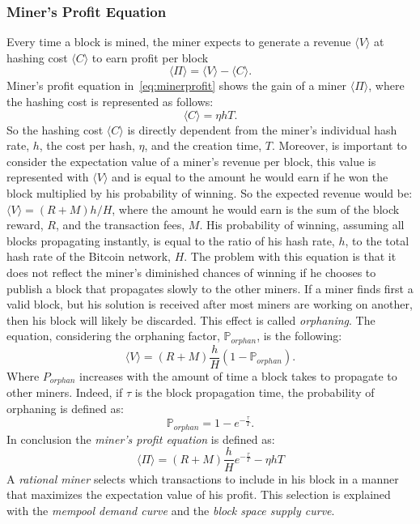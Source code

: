 \documentclass[USenglish]{uit-thesis}
\begin{document}
\subsubsection{Miner's Profit Equation}
Every time a block is mined, the miner expects to generate a revenue $\langle V \rangle$
at hashing cost $\langle C \rangle$ to earn profit per block
\begin{equation}
\label{eq:minerprofit}
\langle \Pi \rangle = \langle V\rangle - \langle C\rangle.
\end{equation}
Miner's profit equation in~\ref{eq:minerprofit} shows the gain of a miner $\langle \Pi \rangle$,
where the hashing cost is represented as follows:
\begin{equation}
\label{eq:hashingcost}
\langle C\rangle = \eta hT.
\end{equation}
So the hashing cost $\langle C\rangle$ is directly dependent from the miner's individual hash rate, $h$,
the cost per hash, $\eta$, and the creation time, $T$. Moreover, is important to consider the
expectation value of a miner's revenue per block, this value is represented with $\langle V\rangle$
and is equal to the amount he would earn if he won the block multiplied by his probability of
winning. So the expected revenue would be:
$\langle V\rangle = (R + M) h/H$,
where the amount he would earn is the sum of the block reward, $R$, and the transaction fees, $M$.
His probability of winning, assuming all blocks propagating instantly, is equal to the ratio of his hash
rate, $h$, to the total hash rate of the Bitcoin network, $H$. The problem with this equation is that it
does not reflect the miner's diminished chances of winning if he chooses to publish a block that propagates
slowly to the other miners. If a miner finds first a valid block, but his solution is received after most miners
are working on another, then his block will likely be discarded. This effect is called \emph{orphaning}. The
equation, considering the orphaning factor, $\mathbb{P}_{orphan}$, is the following:
\begin{equation}
\label{eq:expectedrevenue}
\langle V\rangle = \left(R + M\right)\frac{h}{H}\left(1 - \mathbb{P}_{orphan}\right).
\end{equation}
Where $P_{orphan}$ increases with the amount of time a block takes
to propagate to other miners. Indeed, if $\tau$ is
the block propagation time, the
probability of orphaning is defined as:
\begin{equation}
\label{eq:orphaning}
\mathbb{P}_{orphan} = 1 - e^{-\frac{\tau}{T}}.
\end{equation}
In conclusion the \emph{miner's profit equation} is defined as:
\begin{equation}
\label{eq:minerprofiteq}
\langle \Pi \rangle = (R + M)\frac{h}{H} e^{-\frac{\tau}{T}} -\eta hT
\end{equation}
A \emph{rational miner} selects which transactions to include in his block in a manner that maximizes
the expectation value of his profit. This selection is explained with the \emph{mempool demand curve}
and the \emph{block space supply curve}.
\end{document}
